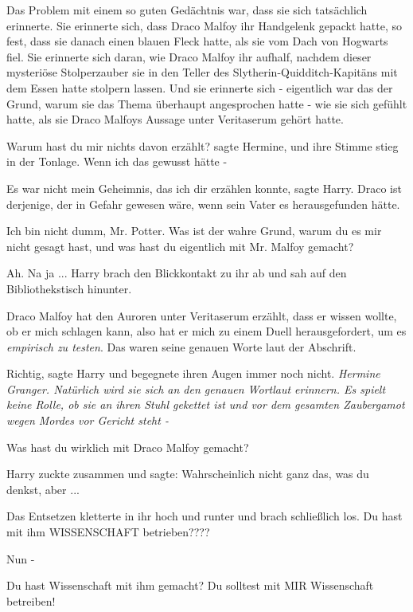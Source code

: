 Das Problem mit einem so guten Gedächtnis war, dass sie sich tatsächlich
erinnerte. Sie erinnerte sich, dass Draco Malfoy ihr Handgelenk gepackt hatte,
so fest, dass sie danach einen blauen Fleck hatte, als sie vom Dach von Hogwarts
fiel. Sie erinnerte sich daran, wie Draco Malfoy ihr aufhalf, nachdem dieser
mysteriöse Stolperzauber sie in den Teller des Slytherin-Quidditch-Kapitäns mit
dem Essen hatte stolpern lassen. Und sie erinnerte sich - eigentlich war das der
Grund, warum sie das Thema überhaupt angesprochen hatte - wie sie sich gefühlt
hatte, als sie Draco Malfoys Aussage unter Veritaserum gehört hatte.

\glqq{}Warum hast du mir nichts davon erzählt?\grqq{} sagte Hermine, und ihre
Stimme stieg in der Tonlage. \glqq{}Wenn ich das gewusst hätte -\grqq{}

\glqq{}Es war nicht mein Geheimnis, das ich dir erzählen konnte\grqq{}, sagte
Harry. \glqq{}Draco ist derjenige, der in Gefahr gewesen wäre, wenn sein Vater es
herausgefunden hätte.\grqq{}

\glqq{}Ich bin nicht dumm, Mr. Potter. Was ist der wahre Grund, warum du es mir
nicht gesagt hast, und was hast du eigentlich mit Mr. Malfoy gemacht?\grqq{}

\glqq{}Ah. Na ja ...\grqq{} Harry brach den Blickkontakt zu ihr ab und sah auf den
Bibliothekstisch hinunter.

\glqq{}Draco Malfoy hat den Auroren unter Veritaserum erzählt, dass er wissen
wollte, ob er mich schlagen kann, also hat er mich zu einem Duell
herausgefordert, um es \emph{empirisch zu testen}. Das waren seine genauen Worte
laut der Abschrift.\grqq{}

\glqq{}Richtig\grqq{}, sagte Harry und begegnete ihren Augen immer noch nicht.
\emph{Hermine Granger. Natürlich wird sie sich an den genauen Wortlaut erinnern.
Es spielt keine Rolle, ob sie an ihren Stuhl gekettet ist und vor dem gesamten
Zaubergamot wegen Mordes vor Gericht steht -}

\glqq{}Was hast du wirklich mit Draco Malfoy gemacht?\grqq{}

Harry zuckte zusammen und sagte: \glqq{}Wahrscheinlich nicht ganz das, was du
denkst, aber ...\grqq{}

Das Entsetzen kletterte in ihr hoch und runter und brach schließlich los. \glqq{}
Du hast mit ihm WISSENSCHAFT betrieben????\grqq{}

\glqq{}Nun -\grqq{}

\glqq{}Du hast Wissenschaft mit ihm gemacht? Du solltest mit MIR Wissenschaft
betreiben!\grqq{}


